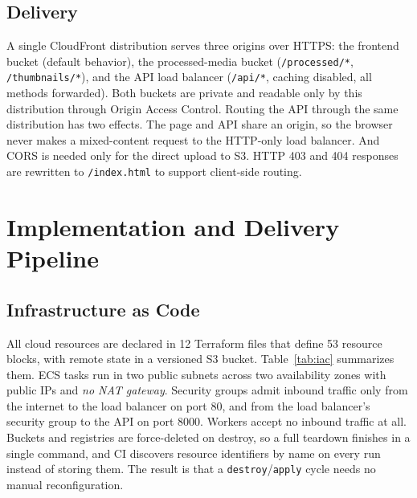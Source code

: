 \documentclass[conference]{IEEEtran}
\begin{document}
\subsection{Delivery}
A single CloudFront distribution serves three origins over HTTPS: the frontend bucket (default behavior), the processed-media bucket (\texttt{/processed/*}, \texttt{/thumbnails/*}), and the API load balancer (\texttt{/api/*}, caching disabled, all methods forwarded). Both buckets are private and readable only by this distribution through Origin Access Control. Routing the API through the same distribution has two effects. The page and API share an origin, so the browser never makes a mixed-content request to the HTTP-only load balancer. And CORS is needed only for the direct upload to S3. HTTP 403 and 404 responses are rewritten to \texttt{/index.html} to support client-side routing.

\section{Implementation and Delivery Pipeline}\label{sec:impl}

\subsection{Infrastructure as Code}
All cloud resources are declared in 12 Terraform files that define 53 resource blocks, with remote state in a versioned S3 bucket. Table~\ref{tab:iac} summarizes them. ECS tasks run in two public subnets across two availability zones with public IPs and \emph{no NAT gateway}. Security groups admit inbound traffic only from the internet to the load balancer on port 80, and from the load balancer's security group to the API on port 8000. Workers accept no inbound traffic at all. Buckets and registries are force-deleted on destroy, so a full teardown finishes in a single command, and CI discovers resource identifiers by name on every run instead of storing them. The result is that a \texttt{destroy}/\texttt{apply} cycle needs no manual reconfiguration.
\end{document}
